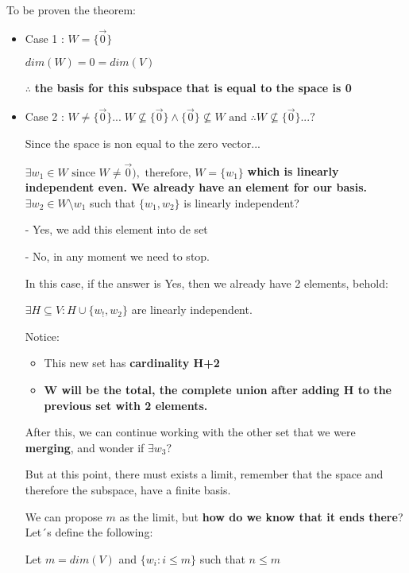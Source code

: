 \documentclass{article}
\begin{document}
To be proven the theorem:
\begin{itemize}
    \item Case 1 : \(W = \{\vec{0}\}\)

    \(dim(W) = 0 = dim(V)\)

    \(\therefore\)\textbf{ the basis for this subspace that is equal to the space is 0}

    \item Case 2 : \(W \neq \{\vec{0}\}... \; W \nsubseteq \{\vec{0}\} \land \{\vec{0}\} \nsubseteq W \text{ and } \therefore W \nsubseteq \{\vec{0}\}...?\)

    Since the space is non equal to the zero vector...

    \(\exists w_1 \in W \text{ since }W \neq \vec{0}),\text{ therefore, } W = \{w_1\}\) \textbf{which is linearly independent even. We already have an element for our basis.}
    \\
    
    \(\exists w_2 \in W \text{\textbackslash}w_1\) such that \(\{w_1, w_2\}\) is linearly independent?

    - Yes, we add this element into de set

    - No, in any moment we need to stop.

    In this case, if the answer is Yes, then we already have 2 elements, behold:

    \(\exists H \subseteq V : H \cup \{w_!, w_2\}\) are linearly independent.

    Notice: 
    \begin{itemize}
    \item This new set has \textbf{cardinality H+2}

    \item \textbf{W will be the total, the complete union after adding H to the previous set with 2 elements.}
    \end{itemize}

    After this, we can continue working with the other set that we were \textbf{merging}, and wonder if \(\exists w_3?\)

    But at this point, there must exists a limit, remember that the space and therefore the subspace, have a finite basis.

    We can propose \(m\) as the limit, but \textbf{how do we know that it ends there}? Let´s define the following:

    Let \(m = dim(V)\) and \(\{w_i : i \leq m\}\) such that \(n \leq m\)


\end{itemize}
\end{document}

